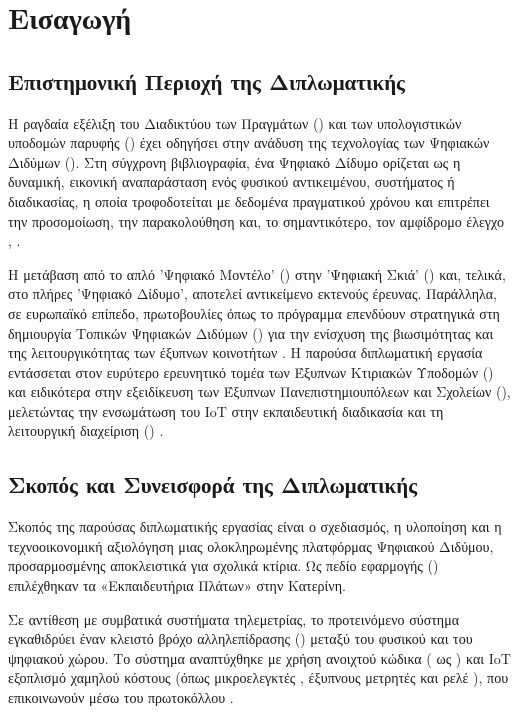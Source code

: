 \chapter{Εισαγωγή}

\section{Επιστημονική Περιοχή της Διπλωματικής}
Η ραγδαία εξέλιξη του Διαδικτύου των Πραγμάτων () και των υπολογιστικών υποδομών παρυφής () έχει οδηγήσει στην ανάδυση της τεχνολογίας των Ψηφιακών Διδύμων (). Στη σύγχρονη βιβλιογραφία, ένα Ψηφιακό Δίδυμο ορίζεται ως η δυναμική, εικονική αναπαράσταση ενός φυσικού αντικειμένου, συστήματος ή διαδικασίας, η οποία τροφοδοτείται με δεδομένα πραγματικού χρόνου και επιτρέπει την προσομοίωση, την παρακολούθηση και, το σημαντικότερο, τον αμφίδρομο έλεγχο \cite{Han2022}, \cite{Kritzinger2018}.

Η μετάβαση από το απλό 'Ψηφιακό Μοντέλο' () στην 'Ψηφιακή Σκιά' () και, τελικά, στο πλήρες 'Ψηφιακό Δίδυμο', αποτελεί αντικείμενο εκτενούς έρευνας. Παράλληλα, σε ευρωπαϊκό επίπεδο, πρωτοβουλίες όπως το πρόγραμμα \textit{} επενδύουν στρατηγικά στη δημιουργία Τοπικών Ψηφιακών Διδύμων () για την ενίσχυση της βιωσιμότητας και της λειτουργικότητας των έξυπνων κοινοτήτων \cite{DigitalEurope2023}. Η παρούσα διπλωματική εργασία εντάσσεται στον ευρύτερο ερευνητικό τομέα των Έξυπνων Κτιριακών Υποδομών () και ειδικότερα στην εξειδίκευση των Έξυπνων Πανεπιστημιουπόλεων και Σχολείων (), μελετώντας την ενσωμάτωση του IoT στην εκπαιδευτική διαδικασία και τη λειτουργική διαχείριση () \cite{Balla2023, Agca2023, Evangelou2022, Cui2023, IoTAnalytics2020}.

\section{Σκοπός και Συνεισφορά της Διπλωματικής}
Σκοπός της παρούσας διπλωματικής εργασίας είναι ο σχεδιασμός, η υλοποίηση και η τεχνοοικονομική αξιολόγηση μιας ολοκληρωμένης πλατφόρμας Ψηφιακού Διδύμου, προσαρμοσμένης αποκλειστικά για σχολικά κτίρια. Ως πεδίο εφαρμογής () επιλέχθηκαν τα «Εκπαιδευτήρια Πλάτων» στην Κατερίνη.

Σε αντίθεση με συμβατικά συστήματα τηλεμετρίας, το προτεινόμενο σύστημα εγκαθιδρύει έναν κλειστό βρόχο αλληλεπίδρασης () μεταξύ του φυσικού και του ψηφιακού χώρου. Το σύστημα αναπτύχθηκε με χρήση ανοιχτού κώδικα ( ως ) και IoT εξοπλισμό χαμηλού κόστους (όπως μικροελεγκτές , έξυπνους μετρητές  και ρελέ ), που επικοινωνούν μέσω του πρωτοκόλλου .

